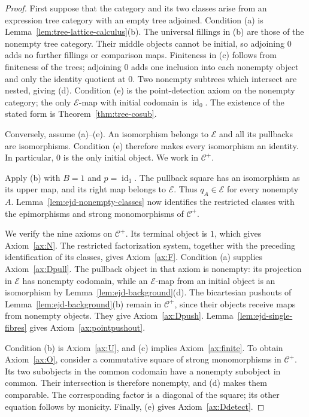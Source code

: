 \documentclass[11pt,a4paper]{article}
\theoremstyle{plain}
\theoremstyle{definition}
\theoremstyle{remark}
\newcommand{\id}{\operatorname{id}}
\begin{document}
\begin{proof}
First suppose that the category and its two classes arise from
an expression tree category with an empty tree adjoined.
Condition (a) is
Lemma~\ref{lem:tree-lattice-calculus}(b). The universal fillings
in (b) are those of the nonempty tree category. Their middle
objects cannot be initial, so adjoining $0$ adds no further
fillings or comparison maps. Finiteness in (c) follows from
finiteness of the trees; adjoining $0$ adds one inclusion into
each nonempty object and only the identity quotient at $0$.
Two nonempty subtrees which intersect are nested, giving (d).
Condition (e) is the point-detection axiom on the nonempty category;
the only $\mathcal E$-map with initial codomain is $\id_0$.
The existence of the stated form is Theorem~\ref{thm:tree-cosub}.

Conversely, assume (a)--(e). An isomorphism belongs to
$\mathcal E$ and all its pullbacks are isomorphisms. Condition
(e) therefore makes every isomorphism an identity. In particular,
$0$ is the only initial object. We work in $\mathcal C^+$.

Apply (b) with $B=1$ and $p=\id_1$. The pullback square has
an isomorphism as its upper map, and its right map belongs to
$\mathcal E$. Thus $q_A\in\mathcal E$ for every nonempty
$A$. Lemma~\ref{lem:ejd-nonempty-classes} now identifies the
restricted classes with the epimorphisms and strong monomorphisms
of $\mathcal C^+$.

We verify the nine axioms on $\mathcal C^+$. Its terminal object
is $1$, which gives Axiom~\ref{ax:N}. The restricted factorization
system, together with the preceding identification of its classes,
gives Axiom~\ref{ax:F}. Condition (a) supplies
Axiom~\ref{ax:Dpull}. The pullback
object in that axiom is nonempty: its projection in $\mathcal E$
has nonempty codomain, while an $\mathcal E$-map from an
initial object is an isomorphism by
Lemma~\ref{lem:ejd-background}(d).
The bicartesian pushouts of Lemma~\ref{lem:ejd-background}(b)
remain in $\mathcal C^+$, since their objects receive maps
from nonempty objects. They give Axiom~\ref{ax:Dpush}.
Lemma~\ref{lem:ejd-single-fibres} gives
Axiom~\ref{ax:pointpushout}.

Condition (b) is Axiom~\ref{ax:U}, and (c) implies
Axiom~\ref{ax:finite}. To obtain Axiom~\ref{ax:O}, consider
a commutative square of strong monomorphisms in $\mathcal C^+$.
Its two subobjects in the common codomain have a nonempty
subobject in common. Their intersection is therefore nonempty,
and (d) makes them comparable. The corresponding factor is a
diagonal of the square; its other equation follows by monicity.
Finally, (e) gives Axiom~\ref{ax:Ddetect}.


\end{proof}
\end{document}
